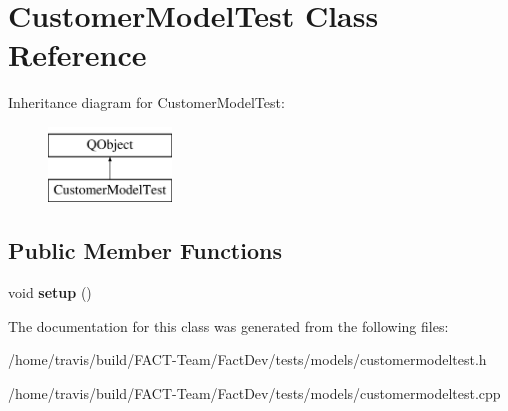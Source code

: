 \hypertarget{classCustomerModelTest}{\section{Customer\-Model\-Test Class Reference}
\label{classCustomerModelTest}
}
Inheritance diagram for Customer\-Model\-Test\-:\begin{figure}[H]
\begin{center}
\leavevmode
\includegraphics[height=2.000000cm]{d5/dcd/classCustomerModelTest}
\end{center}
\end{figure}
\subsection*{Public Member Functions}
\begin{DoxyCompactItemize}
\item 
\hypertarget{classCustomerModelTest_a4909a05e6067adfa8e086bb61022d700}{void {\bfseries setup} ()}\label{classCustomerModelTest_a4909a05e6067adfa8e086bb61022d700}

\end{DoxyCompactItemize}


The documentation for this class was generated from the following files\-:\begin{DoxyCompactItemize}
\item 
/home/travis/build/\-F\-A\-C\-T-\/\-Team/\-Fact\-Dev/tests/models/customermodeltest.\-h\item 
/home/travis/build/\-F\-A\-C\-T-\/\-Team/\-Fact\-Dev/tests/models/customermodeltest.\-cpp\end{DoxyCompactItemize}
